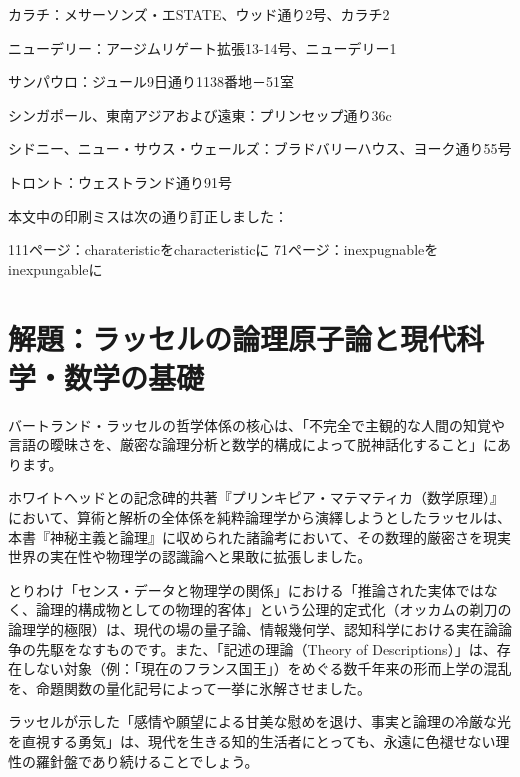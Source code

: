 \documentclass[a4paper,11pt,openany]{ltjsbook}
\begin{document}
カラチ：メサーソンズ・エSTATE、ウッド通り2号、カラチ2

ニューデリー：アージムリゲート拡張13-14号、ニューデリー1

サンパウロ：ジュール9日通り1138番地－51室

シンガポール、東南アジアおよび遠東：プリンセップ通り36c

シドニー、ニュー・サウス・ウェールズ：ブラドバリーハウス、ヨーク通り55号

トロント：ウェストランド通り91号

本文中の印刷ミスは次の通り訂正しました：

111ページ：charateristicをcharacteristicに
71ページ：inexpugnableをinexpungableに



\backmatter

\chapter*{解題：ラッセルの論理原子論と現代科学・数学の基礎}

バートランド・ラッセルの哲学体係の核心は、「不完全で主観的な人間の知覚や言語の曖昧さを、厳密な論理分析と数学的構成によって脱神話化すること」にあります。

ホワイトヘッドとの記念碑的共著『プリンキピア・マテマティカ（数学原理）』において、算術と解析の全体係を純粋論理学から演繹しようとしたラッセルは、本書『神秘主義と論理』に収められた諸論考において、その数理的厳密さを現実世界の実在性や物理学の認識論へと果敢に拡張しました。

とりわけ「センス・データと物理学の関係」における「推論された実体ではなく、論理的構成物としての物理的客体」という公理的定式化（オッカムの剃刀の論理学的極限）は、現代の場の量子論、情報幾何学、認知科学における実在論論争の先駆をなすものです。また、「記述の理論（Theory of Descriptions）」は、存在しない対象（例：「現在のフランス国王」）をめぐる数千年来の形而上学の混乱を、命題関数の量化記号によって一挙に氷解させました。

ラッセルが示した「感情や願望による甘美な慰めを退け、事実と論理の冷厳な光を直視する勇気」は、現代を生きる知的生活者にとっても、永遠に色褪せない理性の羅針盤であり続けることでしょう。
\end{document}
